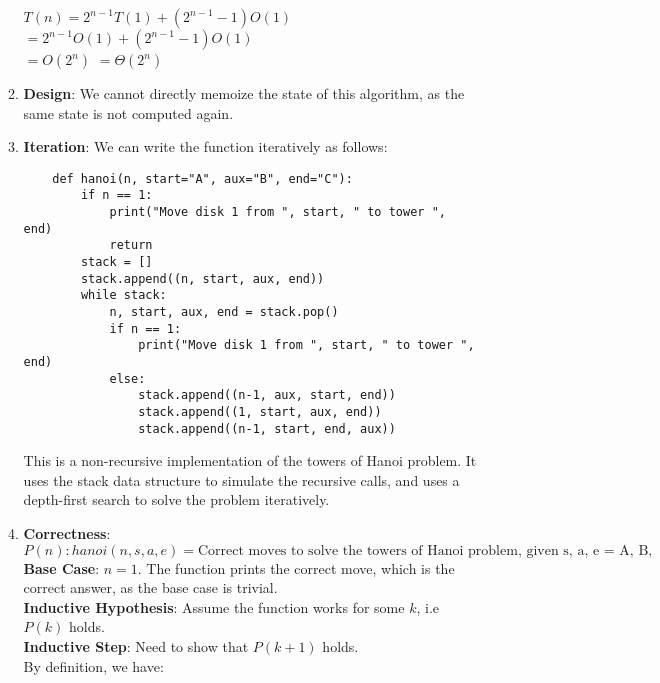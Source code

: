 \documentclass[a4paper]{article}
\begin{document}
\begin{enumerate}
\begin{enumerate}[label=\roman*]
$T(n) = 2^{n-1}T(1) + (2^{n-1} - 1)O(1)$\\
$= 2^{n-1}O(1) + (2^{n-1} - 1)O(1)$\\
$= O(2^n)$
$= \Theta(2^n)$

\item \textbf{Design}: We cannot directly memoize the state of this algorithm, as the same state is not computed again.
\item \textbf{Iteration}: We can write the function iteratively as follows:

\begin{verbatim}
    def hanoi(n, start="A", aux="B", end="C"):
        if n == 1:
            print("Move disk 1 from ", start, " to tower ", end)
            return
        stack = []
        stack.append((n, start, aux, end))
        while stack:
            n, start, aux, end = stack.pop()
            if n == 1:
                print("Move disk 1 from ", start, " to tower ", end)
            else:
                stack.append((n-1, aux, start, end))
                stack.append((1, start, aux, end))
                stack.append((n-1, start, end, aux))
\end{verbatim}

This is a non-recursive implementation of the towers of Hanoi problem. It uses the stack data structure to simulate the recursive calls, and uses a depth-first search to solve the problem iteratively.

\item \textbf{Correctness}:
$$P(n): hanoi(n, s, a, e) = \text{Correct moves to solve the towers of Hanoi problem, given s, a, e = A, B, C respectively.}$$
\textbf{Base Case}: $n = 1$. The function prints the correct move, which is the correct answer, as the base case is trivial. \\
\textbf{Inductive Hypothesis}: Assume the function works for some $k$, i.e $P(k)$ holds.\\
\textbf{Inductive Step}: Need to show that $P(k+1)$ holds.\\
By definition, we have:


\end{enumerate}
\end{enumerate}
\end{document}
